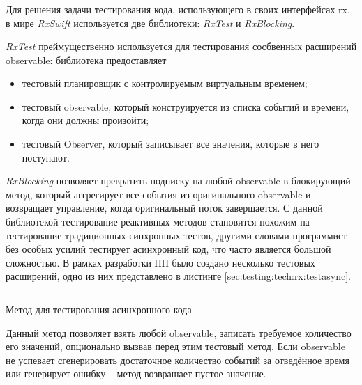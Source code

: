 \subsubsection{}
\label{sec:testing:tech:rx}

Для решения задачи тестирования кода, использующего в своих интерфейсах \gls{rx}, в мире \textit{RxSwift} используется две библиотеки: \textit{RxTest} и \textit{RxBlocking}.

\textit{RxTest} преймущественно используется для тестирования сосбвенных расширений \gls{observable}: библиотека предоставляет

\begin{itemize}
	\item тестовый планировщик с контролируемым виртуальным временем;
	\item тестовый \gls{observable}, который конструируется из списка событий и времени, когда они должны произойти;
	\item тестовый Observer, который записывает все значения, которые в него поступают.
\end{itemize}

\textit{RxBlocking} позволяет превратить подписку на любой \gls{observable} в блокирующий метод, который аггрегирует все события из оригинального \gls{observable} и возвращает управление, когда оригинальный поток завершается. С данной библиотекой тестирование реактивных методов становится похожим на тестирование традиционных синхронных тестов, другими словами программист без особых усилий тестирует асинхронный код, что часто является большой сложностью. В рамках разработки ПП было создано несколько тестовых расширений, одно из них представлено в листинге \ref{sec:testing:tech:rx:testasync}.

\begin{code}[h!]
  \inputminted{swift}{inc/src/testasync.swift}
   \caption{Метод для тестирования асинхронного кода}
   \label{sec:testing:tech:rx:testasync}
\end{code}

Данный метод позволяет взять любой \gls{observable}, записать требуемое количество его значений, опционально вызвав перед этим тестовый метод. Если \gls{observable} не успевает сгенерировать достаточное количество событий за отведённое время или генерирует ошибку -- метод возврашает пустое значение.